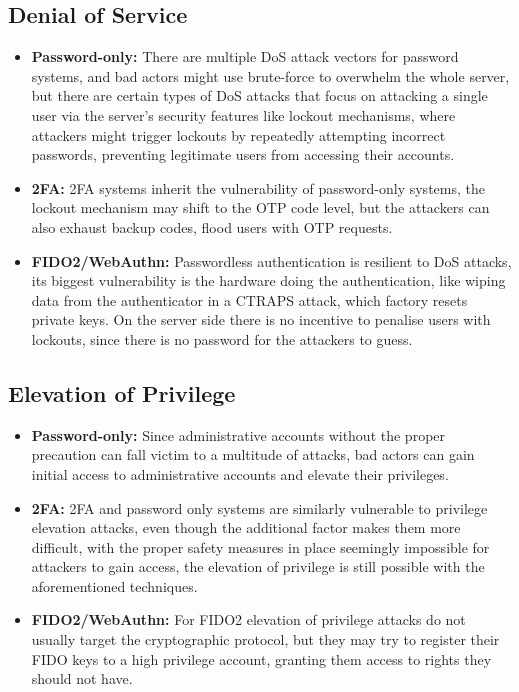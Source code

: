 {\subsection{Denial of Service}
\begin{itemize}[itemsep=0pt, parsep=0pt]
    \item \textbf{Password-only:} There are multiple DoS attack vectors for password systems, and bad actors might use brute-force to overwhelm the whole server, but there are certain types of DoS attacks that focus on attacking a single user via the server's security features like lockout mechanisms, where attackers might trigger lockouts by repeatedly attempting incorrect passwords, preventing legitimate users from accessing their accounts.
    \item \textbf{2FA:} 2FA systems inherit the vulnerability of password-only systems, the lockout mechanism may shift to the OTP code level, but the attackers can also exhaust backup codes, flood users with OTP requests.
    \item \textbf{FIDO2/WebAuthn:} Passwordless authentication is resilient to DoS attacks, its biggest vulnerability is the hardware doing the authentication, like wiping data from the authenticator in a CTRAPS attack, which factory resets private keys. On the server side there is no incentive to penalise users with lockouts, since there is no password for the attackers to guess.
\end{itemize}

\subsection{Elevation of Privilege}
\begin{itemize}[itemsep=0pt, parsep=0pt]
    \item \textbf{Password-only:} Since administrative accounts without the proper precaution can fall victim to a multitude of attacks, bad actors can gain initial access to administrative accounts and elevate their privileges.
    \item \textbf{2FA:} 2FA and password only systems are similarly vulnerable to privilege elevation attacks, even though the additional factor makes them more difficult, with the proper safety measures in place seemingly impossible for attackers to gain access, the elevation of privilege is still possible with the aforementioned techniques.
    \item \textbf{FIDO2/WebAuthn:} For FIDO2 elevation of privilege attacks do not usually target the cryptographic protocol, but they may try to register their FIDO keys to a high privilege account, granting them access to rights they should not have.
\end{itemize}
}
